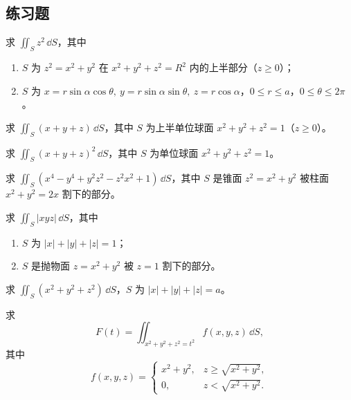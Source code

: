 \subsection{练习题}

\begin{xexercise}[1]
求 $\iint_S z^2\,\dd S$，其中
\begin{enumerate}[label=(\arabic*)]
\item $S$ 为 $z^2=x^2+y^2$ 在 $x^2+y^2+z^2=R^2$ 内的上半部分（$z\ge0$）；
\item $S$ 为 $x=r\sin\alpha\cos\theta,\ y=r\sin\alpha\sin\theta,\ z=r\cos\alpha$，$0\le r\le a$，$0\le\theta\le2\pi$。
\end{enumerate}
\end{xexercise}

\begin{xexercise}[2]
求 $\iint_S(x+y+z)\,\dd S$，其中 $S$ 为上半单位球面 $x^2+y^2+z^2=1$（$z\ge0$）。
\end{xexercise}

\begin{xexercise}[3]
求 $\iint_S(x+y+z)^2\,\dd S$，其中 $S$ 为单位球面 $x^2+y^2+z^2=1$。
\end{xexercise}

\begin{xexercise}[4]
求 $\iint_S(x^4-y^4+y^2z^2-z^2x^2+1)\,\dd S$，其中 $S$ 是锥面 $z^2=x^2+y^2$ 被柱面 $x^2+y^2=2x$ 割下的部分。
\end{xexercise}

\begin{xexercise}[5]
求 $\iint_S|xyz|\,\dd S$，其中
\begin{enumerate}[label=(\arabic*)]
\item $S$ 为 $|x|+|y|+|z|=1$；
\item $S$ 是抛物面 $z=x^2+y^2$ 被 $z=1$ 割下的部分。
\end{enumerate}
\end{xexercise}

\begin{xexercise}[6]
求 $\iint_S(x^2+y^2+z^2)\,\dd S$，$S$ 为 $|x|+|y|+|z|=a$。
\end{xexercise}

\begin{xexercise}[7]
求
\[
  F(t)=\iint_{x^2+y^2+z^2=t^2}f(x,y,z)\,\dd S,
\]
其中
\[
  f(x,y,z)=
  \begin{cases}
    x^2+y^2,& z\ge\sqrt{x^2+y^2},\\
    0,& z<\sqrt{x^2+y^2}.
  \end{cases}
\]
\end{xexercise}

